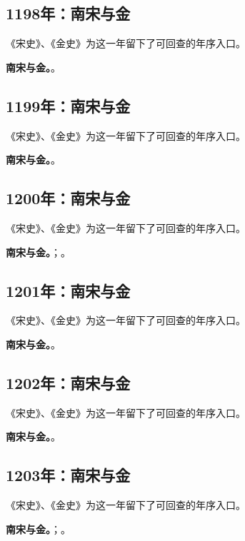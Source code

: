 \subsection{1198年：南宋与金}
《宋史》、《金史》为这一年留下了可回查的年序入口。

\noindent\textbf{南宋与金。}。

\subsection{1199年：南宋与金}
《宋史》、《金史》为这一年留下了可回查的年序入口。

\noindent\textbf{南宋与金。}。

\subsection{1200年：南宋与金}
《宋史》、《金史》为这一年留下了可回查的年序入口。

\noindent\textbf{南宋与金。}；。

\subsection{1201年：南宋与金}
《宋史》、《金史》为这一年留下了可回查的年序入口。

\noindent\textbf{南宋与金。}。

\subsection{1202年：南宋与金}
《宋史》、《金史》为这一年留下了可回查的年序入口。

\noindent\textbf{南宋与金。}。

\subsection{1203年：南宋与金}
《宋史》、《金史》为这一年留下了可回查的年序入口。

\noindent\textbf{南宋与金。}；。

